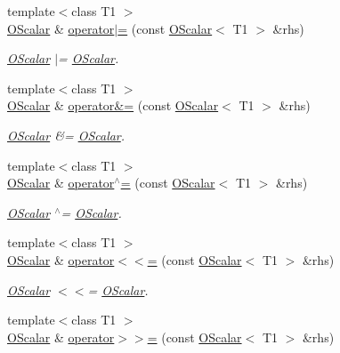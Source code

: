 \begin{DoxyCompactItemize}
{\footnotesize template$<$class T1 $>$ }\\\mbox{\hyperlink{classENSEM_1_1OScalar}{O\+Scalar}} \& \mbox{\hyperlink{classENSEM_1_1OScalar_aeffba612ea04593253d41332d6d2aa82}{operator$\vert$=}} (const \mbox{\hyperlink{classENSEM_1_1OScalar}{O\+Scalar}}$<$ T1 $>$ \&rhs)
\begin{DoxyCompactList}\small\item\em \mbox{\hyperlink{classENSEM_1_1OScalar}{O\+Scalar}} $\vert$= \mbox{\hyperlink{classENSEM_1_1OScalar}{O\+Scalar}}. \end{DoxyCompactList}\item 
{\footnotesize template$<$class T1 $>$ }\\\mbox{\hyperlink{classENSEM_1_1OScalar}{O\+Scalar}} \& \mbox{\hyperlink{classENSEM_1_1OScalar_a9a192875355f059d207c579e2514b2a3}{operator\&=}} (const \mbox{\hyperlink{classENSEM_1_1OScalar}{O\+Scalar}}$<$ T1 $>$ \&rhs)
\begin{DoxyCompactList}\small\item\em \mbox{\hyperlink{classENSEM_1_1OScalar}{O\+Scalar}} \&= \mbox{\hyperlink{classENSEM_1_1OScalar}{O\+Scalar}}. \end{DoxyCompactList}\item 
{\footnotesize template$<$class T1 $>$ }\\\mbox{\hyperlink{classENSEM_1_1OScalar}{O\+Scalar}} \& \mbox{\hyperlink{classENSEM_1_1OScalar_af66decef8e6be220193ad1292a927e2f}{operator$^\wedge$=}} (const \mbox{\hyperlink{classENSEM_1_1OScalar}{O\+Scalar}}$<$ T1 $>$ \&rhs)
\begin{DoxyCompactList}\small\item\em \mbox{\hyperlink{classENSEM_1_1OScalar}{O\+Scalar}} $^\wedge$= \mbox{\hyperlink{classENSEM_1_1OScalar}{O\+Scalar}}. \end{DoxyCompactList}\item 
{\footnotesize template$<$class T1 $>$ }\\\mbox{\hyperlink{classENSEM_1_1OScalar}{O\+Scalar}} \& \mbox{\hyperlink{classENSEM_1_1OScalar_a93607b92c63ae779d9d3ed131df3f449}{operator$<$$<$=}} (const \mbox{\hyperlink{classENSEM_1_1OScalar}{O\+Scalar}}$<$ T1 $>$ \&rhs)
\begin{DoxyCompactList}\small\item\em \mbox{\hyperlink{classENSEM_1_1OScalar}{O\+Scalar}} $<$$<$= \mbox{\hyperlink{classENSEM_1_1OScalar}{O\+Scalar}}. \end{DoxyCompactList}\item 
{\footnotesize template$<$class T1 $>$ }\\\mbox{\hyperlink{classENSEM_1_1OScalar}{O\+Scalar}} \& \mbox{\hyperlink{classENSEM_1_1OScalar_a38ab5a0779184c6ca5a1b3211e2e38ca}{operator$>$$>$=}} (const \mbox{\hyperlink{classENSEM_1_1OScalar}{O\+Scalar}}$<$ T1 $>$ \&rhs)

\end{DoxyCompactItemize}
